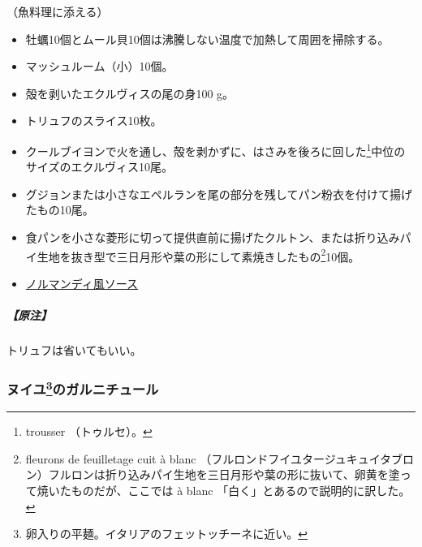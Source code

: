 \begin{recette}


（魚料理に添える）

\begin{itemize}
\item
  牡蠣10個とムール貝10個は沸騰しない温度で加熱して周囲を掃除する。
\item
  マッシュルーム（小）10個。
\item
  殻を剥いたエクルヴィスの尾の身100 g。
\item
  トリュフのスライス10枚。
\item
  クールブイヨンで火を通し、殻を剥かずに、はさみを後ろに回した\footnote{trousser
    （トゥルセ）。}中位のサイズのエクルヴィス10尾。
\item
  グジョンまたは小さなエペルランを尾の部分を残してパン粉衣を付けて揚げたもの10尾。
\item
  食パンを小さな菱形に切って提供直前に揚げたクルトン、または折り込みパイ生地を抜き型で三日月形や葉の形にして素焼きしたもの\footnote{fleurons
    de feuilletage cuit à blanc
    （フルロンドフイユタージュキュイタブロン）フルロンは折り込みパイ生地を三日月形や葉の形に抜いて、卵黄を塗って焼いたものだが、ここでは
    à blanc 「白く」とあるので説明的に訳した。}10個。
\item
  \protect\hyperlink{sauce-normande}{ノルマンディ風ソース}
\end{itemize}

\hypertarget{ux539fux6ce8}{%
\subparagraph{【原注】}\label{ux539fux6ce8}}

トリュフは省いてもいい。

\hypertarget{garniture-de-nouilles}{%
\subsubsection[ヌイユのガルニチュール]{\texorpdfstring{ヌイユ\footnote{卵入りの平麺。イタリアのフェットッチーネに近い。}のガルニチュール}{ヌイユのガルニチュール}}\label{garniture-de-nouilles}}




\end{recette}
